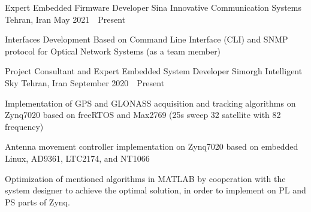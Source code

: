 


\begin{cventries}

  \cventry
    {Expert Embedded Firmware Developer} %
    {Sina Innovative Communication Systems} %
    {Tehran, Iran} %
    {May 2021~\textendash~Present} %
    {
      \begin{cvitems} %
        \item {Interfaces Development Based on Command Line Interface (CLI) and SNMP protocol for Optical Network Systems (as a team member)}
      \end{cvitems}
    }

  \cventry
    {Project Consultant and Expert Embedded System Developer} %
    {Simorgh Intelligent Sky} %
    {Tehran, Iran} %
    {September 2020~\textendash~Present} %
    {
      \begin{cvitems} %
        \item {Implementation of GPS and GLONASS acquisition and tracking algorithms on Zynq7020 based on freeRTOS and Max2769 (25s sweep 32 satellite with 82 frequency)}
        \item {Antenna movement controller implementation on Zynq7020 based on embedded Linux, AD9361, LTC2174, and NT1066}
	\item {Optimization of mentioned algorithms in MATLAB by cooperation with the system designer to achieve the optimal solution, in order to implement on PL and PS parts of Zynq.}
      \end{cvitems}
    }


\end{cventries}
